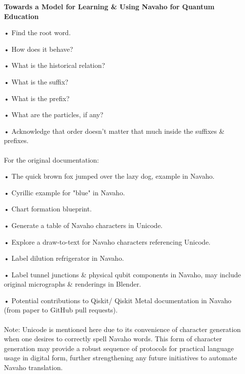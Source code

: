 \begin{center}
\Large\textbf{Towards a Model for Learning \& Using Navaho for Quantum Education}
\end{center}

\large{
• Find the root word.

• How does it behave?

• What is the historical relation?

• What is the suffix?

• What is the prefix?

• What are the particles, if any?

• Acknowledge that order doesn't matter that much inside the suffixes \& prefixes.
\\ 
\space
\\
For the original documentation:

• The quick brown fox jumped over the lazy dog, example in Navaho.

• Cyrillic example for "blue" in Navaho.

• Chart formation blueprint.

• Generate a table of Navaho characters in Unicode.

• Explore a draw-to-text for Navaho characters referencing Unicode.

• Label dilution refrigerator in Navaho.

• Label tunnel junctions \& physical qubit components in Navaho, may include original micrographs \& renderings in Blender.

• Potential contributions to Qiskit/ Qiskit Metal documentation in Navaho (from paper to GitHub pull requests).
\\ 
\space
\\
Note: Unicode is mentioned here due to its convenience of character generation when one desires to correctly spell Navaho words. This form of character generation may provide a robust sequence of protocols for practical language usage in digital form, further strengthening any future initiatives to automate Navaho translation.
\\ 
\space
\\
\indent
}